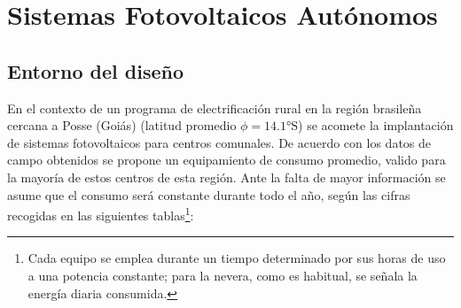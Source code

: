 \clearpage{}

\section{Sistemas Fotovoltaicos Autónomos}

\subsection{Entorno del diseño}

En el contexto de un programa de electrificación rural en la región
brasileña cercana a Posse (Goiás) (latitud promedio $\phi=\ang{14.1}\mathrm{S}$)
se acomete la implantación de sistemas fotovoltaicos para centros
comunales. De acuerdo con los datos de campo obtenidos se propone
un equipamiento de consumo promedio, valido para la mayoría de estos
centros de esta región. Ante la falta de mayor información se asume
que el consumo será constante durante todo el año, según las cifras
recogidas en las siguientes tablas\footnote{Cada equipo se emplea durante un
tiempo determinado por sus horas de uso a una potencia constante; para
la nevera, como es habitual, se señala la energía diaria consumida.}:

